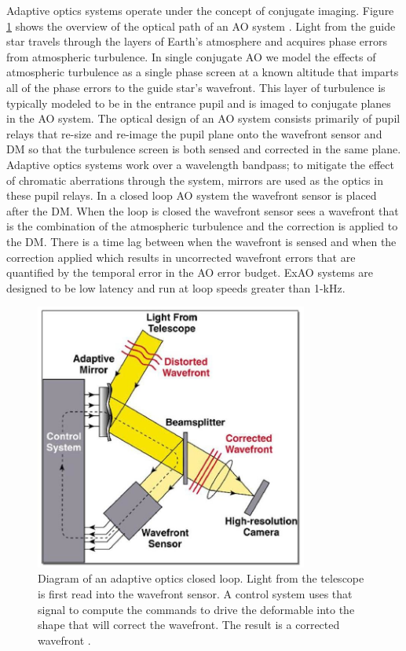 Adaptive optics systems operate under the concept of conjugate imaging. Figure \ref{fig:AOdiagram} shows the overview of the optical path of an AO system \citep{suarez2017approach}. Light from the guide star travels through the layers of Earth's atmosphere and acquires phase errors from atmospheric turbulence. In single conjugate AO we model the effects of atmospheric turbulence as a single phase screen at a known altitude that imparts all of the phase errors to the guide star's wavefront. This layer of turbulence is typically modeled to be in the entrance pupil and is imaged to conjugate planes in the AO system. The optical design of an AO system consists primarily of pupil relays that re-size and re-image the pupil plane onto the wavefront sensor and DM so that the turbulence screen is both sensed and corrected in the same plane. Adaptive optics systems work over a wavelength bandpass; to mitigate the effect of chromatic aberrations through the system, mirrors are used as the optics in these pupil relays. In a closed loop AO system the wavefront sensor is placed after the DM. When the loop is closed the wavefront sensor sees a wavefront that is the combination of the atmospheric turbulence and the correction is applied to the DM. There is a time lag between when the wavefront is sensed and when the correction applied which results in uncorrected wavefront errors that are quantified by the temporal error in the AO error budget. ExAO systems are designed to be low latency and run at loop speeds greater than 1-kHz.




\begin{figure}
    \centering
    \includegraphics[width=0.8\textwidth]{Chapter Materials/Chapter Two Materials/Adaptive-Optics-System.png}
    \caption{Diagram of an adaptive optics closed loop. Light from the telescope is first read into the wavefront sensor. A control system uses that signal to compute the commands to drive the deformable into the shape that will correct the wavefront. The result is a corrected wavefront \citep{suarez2017approach}.}
    \label{fig:AOdiagram}
\end{figure}

